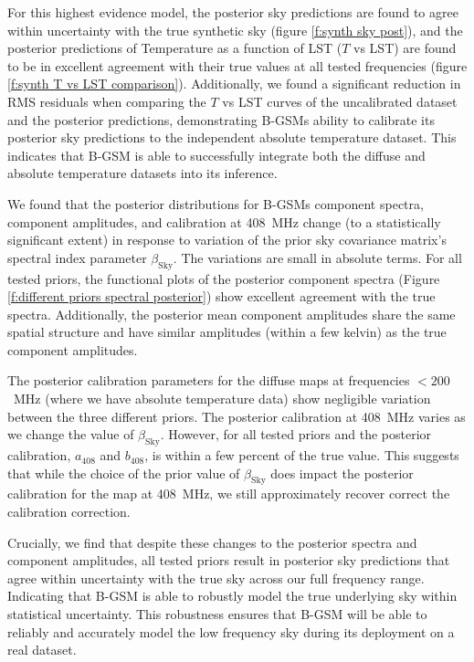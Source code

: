 \documentclass[fleqn,usenatbib]{mnras}
\begin{document}
For this highest evidence model, the posterior sky predictions are found to agree within uncertainty with the true synthetic sky (figure \ref{f:synth sky post}), and the posterior predictions of Temperature as a function of LST ($T$ vs LST) are found to be in excellent agreement with their true values at all tested frequencies (figure \ref{f:synth T vs LST comparison}). Additionally, we found a significant reduction in RMS residuals when comparing the $T$ vs LST curves of the uncalibrated dataset and the posterior predictions, demonstrating B-GSMs ability to calibrate its posterior sky predictions to the independent absolute temperature dataset. This indicates that B-GSM is able to successfully integrate both the diffuse and absolute temperature datasets into its inference. 


We found that the posterior distributions for B-GSMs component spectra, component amplitudes, and calibration at 408~MHz change (to a statistically significant extent) in response to variation of the prior sky covariance matrix's spectral index parameter $\beta_\mathrm{Sky}$. The variations are small in absolute terms. For all tested priors, the functional plots of the posterior component spectra (Figure \ref{f:different priors spectral posterior}) show excellent agreement with the true spectra. Additionally, the posterior mean component amplitudes share the same spatial structure and have similar amplitudes (within a few kelvin) as the true component amplitudes.  

The posterior calibration parameters for the diffuse maps at frequencies $<200$~MHz (where we have absolute temperature data) show negligible variation between the three different priors. The posterior calibration at 408~MHz varies as we change the value of $\beta_\mathrm{Sky}$. However, for all tested priors and the posterior calibration, $a_{408}$ and $b_{408}$, is within a few percent of the true value. This suggests that while the choice of the prior value of $\beta_\mathrm{Sky}$ does impact the posterior calibration for the map at 408~MHz, we still approximately recover correct the calibration correction. 

Crucially, we find that despite these changes to the posterior spectra and component amplitudes, all tested priors result in posterior sky predictions that agree within uncertainty with the true sky across our full frequency range. Indicating that B-GSM is able to robustly model the true underlying sky within statistical uncertainty. This robustness ensures that B-GSM will be able to reliably and accurately model the low frequency sky during its deployment on a real dataset. 
\end{document}
